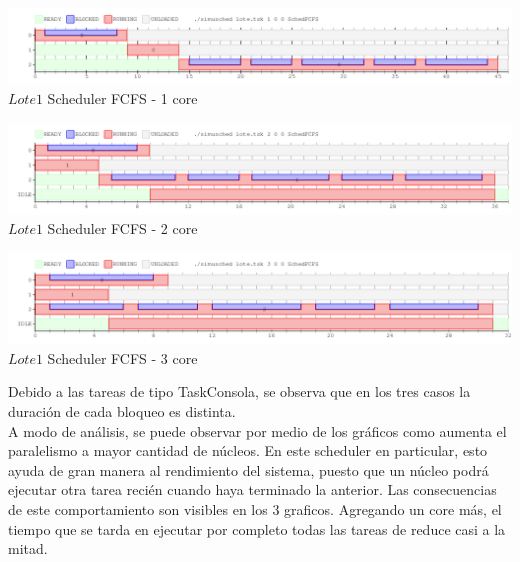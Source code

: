 \vspace*{0.3cm} \vspace*{0.3cm}
  \begin{center}
 \includegraphics[scale=0.5]{ejercicio2-1nucleo.png}
 { $Lote 1$ Scheduler FCFS - 1 core }
 \end{center}
  \vspace*{0.3cm}


\vspace*{0.3cm} \vspace*{0.3cm}
  \begin{center}
 \includegraphics[scale=0.5]{ejercicio2-2nucleo.png}
 { $Lote 1$ Scheduler FCFS - 2 core }
 \end{center}
  \vspace*{0.3cm}

\vspace*{0.3cm} \vspace*{0.3cm}
  \begin{center}
 \includegraphics[scale=0.5]{ejercicio2-3nucleo.png}
  {$Lote 1$ Scheduler FCFS - 3 core }
 \end{center}
  \vspace*{0.3cm}

\indent Debido a las tareas de tipo TaskConsola, se observa que en los tres casos la duración 
de cada bloqueo es distinta.\\
\indent A modo de análisis, se puede observar por medio de los gráficos como aumenta el paralelismo a mayor cantidad de núcleos. 
En este scheduler en particular, esto ayuda de gran manera al rendimiento del sistema, puesto que un núcleo podrá ejecutar otra tarea 
recién cuando haya terminado la anterior. Las consecuencias de este comportamiento son visibles en los 3 graficos. Agregando un core más, 
el tiempo que se tarda en ejecutar por completo todas las tareas de reduce casi a la mitad.\\

